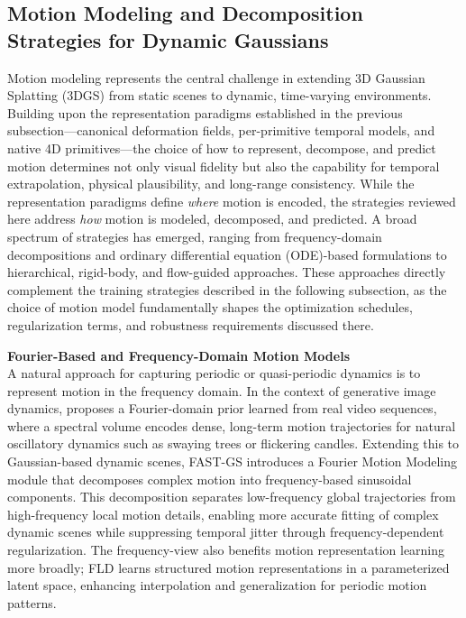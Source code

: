 \documentclass[11pt]{article}
\begin{document}
\subsection{Motion Modeling and Decomposition Strategies for Dynamic Gaussians}

Motion modeling represents the central challenge in extending 3D Gaussian Splatting (3DGS) from static scenes to dynamic, time-varying environments. Building upon the representation paradigms established in the previous subsection---canonical deformation fields, per-primitive temporal models, and native 4D primitives---the choice of how to represent, decompose, and predict motion determines not only visual fidelity but also the capability for temporal extrapolation, physical plausibility, and long-range consistency. While the representation paradigms define \emph{where} motion is encoded, the strategies reviewed here address \emph{how} motion is modeled, decomposed, and predicted. A broad spectrum of strategies has emerged, ranging from frequency-domain decompositions and ordinary differential equation (ODE)-based formulations to hierarchical, rigid-body, and flow-guided approaches. These approaches directly complement the training strategies described in the following subsection, as the choice of motion model fundamentally shapes the optimization schedules, regularization terms, and robustness requirements discussed there.

\textbf{Fourier-Based and Frequency-Domain Motion Models}\\
A natural approach for capturing periodic or quasi-periodic dynamics is to represent motion in the frequency domain. In the context of generative image dynamics, \cite{ref345} proposes a Fourier-domain prior learned from real video sequences, where a spectral volume encodes dense, long-term motion trajectories for natural oscillatory dynamics such as swaying trees or flickering candles. Extending this to Gaussian-based dynamic scenes, FAST-GS \cite{ref346} introduces a Fourier Motion Modeling module that decomposes complex motion into frequency-based sinusoidal components. This decomposition separates low-frequency global trajectories from high-frequency local motion details, enabling more accurate fitting of complex dynamic scenes while suppressing temporal jitter through frequency-dependent regularization. The frequency-view also benefits motion representation learning more broadly; FLD \cite{ref347} learns structured motion representations in a parameterized latent space, enhancing interpolation and generalization for periodic motion patterns.
\end{document}
